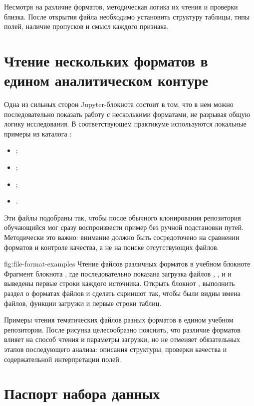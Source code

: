Несмотря на различие форматов, методическая логика их чтения и проверки близка. После открытия файла необходимо установить структуру таблицы, типы полей, наличие пропусков и смысл каждого признака.

\section{Чтение нескольких форматов в едином аналитическом контуре}

Одна из сильных сторон Jupyter-блокнота состоит в том, что в нем можно последовательно показать работу с несколькими форматами, не разрывая общую логику исследования. В соответствующем практикуме используются локальные примеры из каталога :
\begin{itemize}[leftmargin=1.25cm]
\item {};
\item {};
\item {};
\item {}.
\end{itemize}

Эти файлы подобраны так, чтобы после обычного клонирования репозитория обучающийся мог сразу воспроизвести пример без ручной подстановки путей. Методически это важно: внимание должно быть сосредоточено на сравнении форматов и контроле качества, а не на поиске отсутствующих файлов.

\screenshotplaceholder
  {fig:file-format-examples}
  {Чтение файлов различных форматов в учебном блокноте}
  {Фрагмент блокнота , где последовательно показана загрузка файлов , ,  и  и выведены первые строки каждого источника.}
  {Открыть блокнот , выполнить раздел о форматах файлов и сделать скриншот так, чтобы были видны имена файлов, функции загрузки и первые строки таблиц.}

\figureinstruction
  {Примеры чтения тематических файлов разных форматов в едином учебном репозитории.}
  {После рисунка целесообразно пояснить, что различие форматов влияет на способ чтения и параметры загрузки, но не отменяет обязательных этапов последующего анализа: описания структуры, проверки качества и содержательной интерпретации полей.}

\section{Паспорт набора данных}

